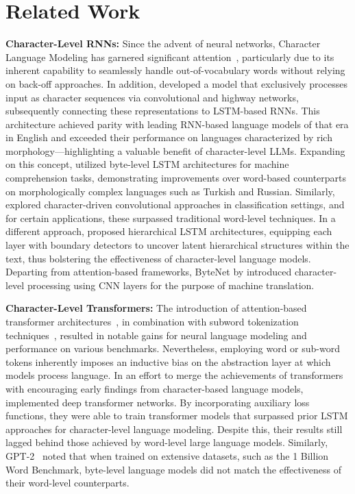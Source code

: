 \section{Related Work}
\label{section:related_work}

\textbf{Character-Level RNNs:} Since the advent of neural networks, Character Language Modeling has garnered significant attention~\citep{sutskever2011generating,mikolov2012subword,graves2013generating}, particularly due to its inherent capability to seamlessly handle out-of-vocabulary words without relying on back-off approaches. In addition, \cite{kim2016character} developed a model that exclusively processes input as character sequences via convolutional and highway networks, subsequently connecting these representations to LSTM-based RNNs. This architecture achieved parity with leading RNN-based language models of that era in English and exceeded their performance on languages characterized by rich morphology—highlighting a valuable benefit of character-level LLMs. Expanding on this concept, \cite{kenter2018byte} utilized byte-level LSTM architectures for machine comprehension tasks, demonstrating improvements over word-based counterparts on morphologically complex languages such as Turkish and Russian. Similarly, \cite{zhang2015character} explored character-driven convolutional approaches in classification settings, and for certain applications, these surpassed traditional word-level techniques. In a different approach, \citet{chung2019hierarchical} proposed hierarchical LSTM architectures, equipping each layer with boundary detectors to uncover latent hierarchical structures within the text, thus bolstering the effectiveness of character-level language models. Departing from attention-based frameworks, ByteNet by \cite{kalchbrenner2016neural} introduced character-level processing using CNN layers for the purpose of machine translation.

\textbf{Character-Level Transformers:} The introduction of attention-based transformer architectures~\citep{vaswani2017attention}, in combination with subword tokenization techniques~\citep{sennrich-etal-2016-neural}, resulted in notable gains for neural language modeling and performance on various benchmarks. Nevertheless, employing word or sub-word tokens inherently imposes an inductive bias on the abstraction layer at which models process language. In an effort to merge the achievements of transformers with encouraging early findings from character-based language models, \citet{al2019character} implemented deep transformer networks. By incorporating auxiliary loss functions, they were able to train transformer models that surpassed prior LSTM approaches for character-level language modeling. Despite this, their results still lagged behind those achieved by word-level large language models. Similarly, GPT-2~\citep{radfordgpt2} noted that when trained on extensive datasets, such as the 1 Billion Word Benchmark, byte-level language models did not match the effectiveness of their word-level counterparts.

